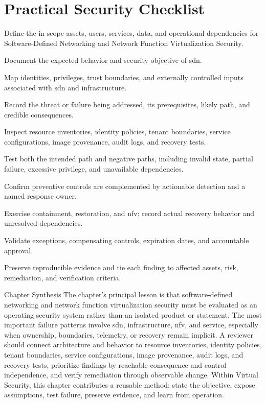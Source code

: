 \documentclass[11pt,letterpaper]{article}
\begin{document}
\section*{Practical Security Checklist}
\begin{CornellChecklist}
\item Define the in-scope assets, users, services, data, and operational dependencies for Software-Defined Networking and Network Function Virtualization Security.
\item Document the expected behavior and security objective of sdn.
\item Map identities, privileges, trust boundaries, and externally controlled inputs associated with sdn and infrastructure.
\item Record the threat or failure being addressed, its prerequisites, likely path, and credible consequences.
\item Inspect resource inventories, identity policies, tenant boundaries, service configurations, image provenance, audit logs, and recovery tests.
\item Test both the intended path and negative paths, including invalid state, partial failure, excessive privilege, and unavailable dependencies.
\item Confirm preventive controls are complemented by actionable detection and a named response owner.
\item Exercise containment, restoration, and nfv; record actual recovery behavior and unresolved dependencies.
\item Validate exceptions, compensating controls, expiration dates, and accountable approval.
\item Preserve reproducible evidence and tie each finding to affected assets, risk, remediation, and verification criteria.
\end{CornellChecklist}
\begin{CornellSummaryBox}{Chapter Synthesis}
The chapter's principal lesson is that software-defined networking and network function virtualization security must be evaluated as an operating security system rather than an isolated product or statement. The most important failure patterns involve sdn, infrastructure, nfv, and service, especially when ownership, boundaries, telemetry, or recovery remain implicit. A reviewer should connect architecture and behavior to resource inventories, identity policies, tenant boundaries, service configurations, image provenance, audit logs, and recovery tests, prioritize findings by reachable consequence and control independence, and verify remediation through observable change. Within Virtual Security, this chapter contributes a reusable method: state the objective, expose assumptions, test failure, preserve evidence, and learn from operation.
\end{CornellSummaryBox}
\end{document}
